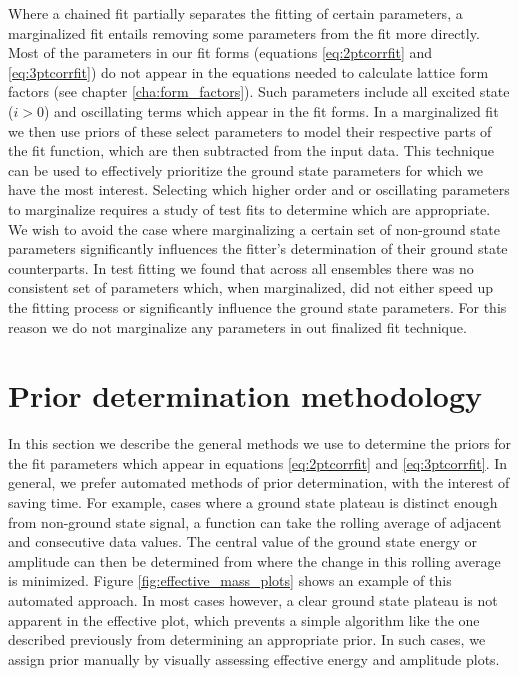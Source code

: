 Where a chained fit partially separates the fitting of certain parameters, a marginalized fit entails removing some parameters from the fit more directly.  Most of the parameters in our fit forms (equations \ref{eq:2ptcorrfit} and \ref{eq:3ptcorrfit}) do not appear in the equations needed to calculate lattice form factors (see chapter \ref{cha:form_factors}).  Such parameters include all excited state ($i>0$) and oscillating terms which appear in the fit forms.   In a marginalized fit we then use priors of these select parameters to model their respective parts of the fit function, which are then subtracted from the input data. This technique can be used to effectively prioritize the ground state parameters for which we have the most interest.  Selecting which higher order and or oscillating parameters to marginalize requires a study of test fits to determine which are appropriate.  We wish to avoid the case where marginalizing a certain set of non-ground state parameters significantly influences the fitter's determination of their ground state counterparts.  In test fitting we found that across all ensembles there was no consistent set of parameters which, when marginalized, did not either speed up the fitting process or significantly influence the ground state parameters.  For this reason we do not marginalize any parameters in out finalized fit technique.

\section{Prior determination methodology}\label{sec:prior_determination_methodology}
In this section we describe the general methods we use to determine the priors for the fit parameters which appear in equations \ref{eq:2ptcorrfit} and \ref{eq:3ptcorrfit}.  In general, we prefer automated methods of prior determination, with the interest of saving time.  For example, cases where a ground state plateau is distinct enough from non-ground state signal, a function can take the rolling average of adjacent and consecutive data values.  The central value of the ground state energy or amplitude can then be determined from where the change in this rolling average is minimized.  Figure \ref{fig:effective_mass_plots} shows an example of this automated approach.  In most cases however, a clear ground state plateau is not apparent in the effective plot, which prevents a simple algorithm like the one described previously from determining an appropriate prior. In such cases, we assign prior manually by visually assessing effective energy and amplitude plots. 


